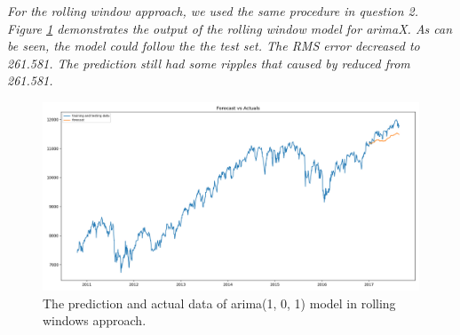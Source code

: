 \textit{For the rolling window approach, we used the same procedure in question 2. Figure \ref{fig:Ass2_Q3_Rolling_Forecast_vs_Actuals} demonstrates the output of the rolling window model for \gls{arima}X. As can be seen, the model could follow the the test set. The RMS error decreased to 261.581. The prediction still had some ripples that caused by reduced from 261.581.}

\begin{figure}[H]
    \centering
    \begin{minipage}[b]{1\textwidth}
        \includegraphics[width=\textwidth]{manuscript/src/figures/Ass2/Ass2_Q3_Rolling_Forecast_vs_Actuals.png}
    \end{minipage}
    \caption{The prediction and actual data of \gls{arima}(1, 0, 1) model in rolling windows approach.}
    \label{fig:Ass2_Q3_Rolling_Forecast_vs_Actuals}
\end{figure}









